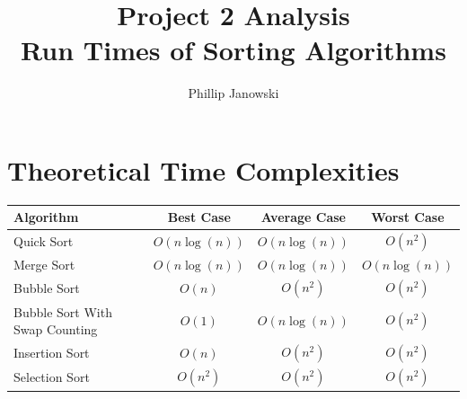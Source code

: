 \documentclass[]{article}
\title{%
	Project 2 Analysis\\
	\large Run Times of Sorting Algorithms}
\author{Phillip Janowski}
\begin{document}
\maketitle

\section{Theoretical Time Complexities}
\begin{center}
	\begin{tabular} {|l|c|c|c|}
		\hline
		Algorithm & Best Case & Average Case & Worst Case\\
		\hline 
		Quick Sort & $ O(n \log(n)) $ & $ O(n\log(n)) $ & $ O(n^2) $\\
		\hline
		Merge Sort & $ O(n \log(n)) $ & $ O(n\log(n)) $ & $ O(n \log(n)) $\\
		\hline
		Bubble Sort & $ O(n) $ & $ O(n^2) $ & $ O(n^2) $\\
		\hline
		Bubble Sort With Swap Counting & $ O(1) $ & $ O(n \log(n)) $ & $ O(n^2) $\\
		\hline
		Insertion Sort & $ O(n) $ & $ O(n^2) $ & $ O(n^2) $\\
		\hline
		Selection Sort & $ O(n^2) $ & $ O(n^2) $ & $ O(n^2) $\\
		\hline
	\end{tabular}
\end{center}
\end{document}
